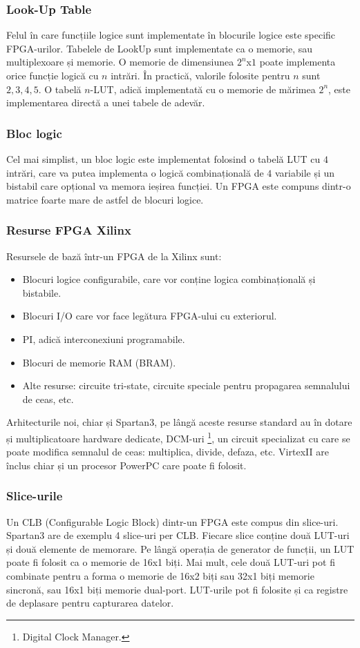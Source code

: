 \documentclass[12pt,twoside,a4paper,fleqn]{book}
\theoremstyle{definition}
\begin{document}
\subsubsection{Look-Up Table}
\label{hard_LUT}
Felul în care funcțiile logice sunt implementate în blocurile logice este specific FPGA-urilor. Tabelele de LookUp sunt implementate ca o memorie, sau multiplexoare și memorie. O memorie de dimensiunea $2^{n}$x$1$ poate implementa orice funcție logică cu $n$ intrări. În practică, valorile folosite pentru $n$ sunt $2,3,4,5$. O tabelă $n$-LUT, adică implementată cu o memorie de mărimea $2^{n}$, este implementarea directă a unei tabele de adevăr.
\subsubsection{Bloc logic}
Cel mai simplist, un bloc logic este implementat folosind o tabelă LUT cu $4$ intrări, care va putea implementa o logică combinațională de $4$ variabile și un bistabil care opțional va memora ieșirea funcției. Un FPGA este compuns dintr-o matrice foarte mare de astfel de blocuri logice.
\subsubsection{Resurse FPGA Xilinx}
Resursele de bază într-un FPGA de la Xilinx sunt:
\begin{itemize}
\item Blocuri logice configurabile, care vor conține logica combinațională și bistabile.
\item Blocuri I/O care vor face legătura FPGA-ului cu exteriorul.
\item PI, adică interconexiuni programabile.
\item Blocuri de memorie RAM (BRAM).
\item Alte resurse: circuite tri-state, circuite speciale pentru propagarea semnalului de ceas, etc.
\end{itemize}

Arhitecturile noi, chiar și Spartan3, pe lângă aceste resurse standard au în dotare și multiplicatoare hardware dedicate, DCM-uri \footnote{Digital Clock Manager.}, un circuit specializat cu care se poate modifica semnalul de ceas: multiplica, divide, defaza, etc. VirtexII are înclus chiar și un procesor PowerPC care poate fi folosit.

\subsubsection{Slice-urile}
Un CLB (Configurable Logic Block) dintr-un FPGA este compus din slice-uri. Spartan3 are de exemplu 4 slice-uri per CLB. Fiecare slice conține două LUT-uri și două elemente de memorare. Pe lângă operația de generator de funcții, un LUT poate fi folosit ca o memorie de 16x1 biți. Mai mult, cele două LUT-uri pot fi combinate pentru a forma o memorie de 16x2 biți sau 32x1 biți memorie sincronă, sau 16x1 biți memorie dual-port. LUT-urile pot fi folosite și ca registre de deplasare pentru capturarea datelor.
\end{document}
